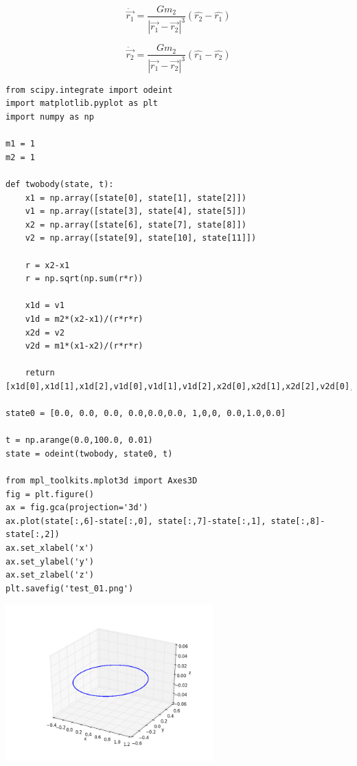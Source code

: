 \documentclass[12pt,fleqn]{article}\usepackage{../../common}
\begin{document}
$$ {\displaystyle {\ddot {\vec {r_{1}}}}={\frac {Gm_{2}}{|{\vec
        {r_{1}}}-{\vec {r_{2}}}|^{3}}}({\hat {r_{2}}}-{\hat {r_{1}}})}
$$

$${\displaystyle {\ddot {\vec {r_{2}}}}={\frac {Gm_{2}}{|{\vec
        {r_{1}}}-{\vec {r_{2}}}|^{3}}}({\hat {r_{1}}}-{\hat {r_{2}}})}
$$ 



\begin{verbatim}
from scipy.integrate import odeint
import matplotlib.pyplot as plt
import numpy as np

m1 = 1
m2 = 1

def twobody(state, t):
    x1 = np.array([state[0], state[1], state[2]])
    v1 = np.array([state[3], state[4], state[5]])
    x2 = np.array([state[6], state[7], state[8]])
    v2 = np.array([state[9], state[10], state[11]])

    r = x2-x1
    r = np.sqrt(np.sum(r*r))

    x1d = v1
    v1d = m2*(x2-x1)/(r*r*r)
    x2d = v2
    v2d = m1*(x1-x2)/(r*r*r)

    return [x1d[0],x1d[1],x1d[2],v1d[0],v1d[1],v1d[2],x2d[0],x2d[1],x2d[2],v2d[0],v2d[1],v2d[2]]

state0 = [0.0, 0.0, 0.0, 0.0,0.0,0.0, 1,0,0, 0.0,1.0,0.0]

t = np.arange(0.0,100.0, 0.01)
state = odeint(twobody, state0, t)

from mpl_toolkits.mplot3d import Axes3D
fig = plt.figure()
ax = fig.gca(projection='3d')
ax.plot(state[:,6]-state[:,0], state[:,7]-state[:,1], state[:,8]-state[:,2])
ax.set_xlabel('x')
ax.set_ylabel('y')
ax.set_zlabel('z')
plt.savefig('test_01.png')
\end{verbatim}

\includegraphics[height=6cm]{twobody_01.png}
\end{document}
